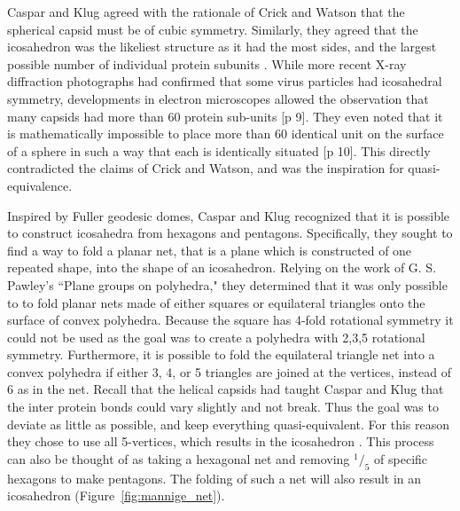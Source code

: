 \documentclass[12pt,letter]{article}
\newcommand*\rfrac[2]{{}^{#1}\!/_{#2}}
\begin{document}
Caspar and Klug agreed with the rationale of Crick and Watson that the spherical capsid must be of cubic symmetry. Similarly, they agreed that the icosahedron was the likeliest structure as it had the most sides, and the largest possible number of individual protein subunits \cite[p 7-8]{Caspar:1962}. While more recent X-ray diffraction photographs had confirmed that some virus particles had icosahedral symmetry, developments in electron microscopes allowed the observation that many capsids had more than 60 protein sub-units [p 9]. They even noted that it is mathematically impossible to place more than 60 identical unit on the surface of a sphere in such a way that each is identically situated [p 10]. This directly contradicted the claims of Crick and Watson, and was the inspiration for quasi-equivalence.

Inspired by Fuller geodesic domes, Caspar and Klug recognized that it is possible to construct icosahedra from hexagons and pentagons. Specifically, they sought to find a way to fold a planar net, that is a plane which is constructed of one repeated shape, into the shape of an icosahedron. Relying on the work of G. S. Pawley's ``Plane groups on polyhedra," \cite{Pawley:1962} they determined that it was only possible to to fold planar nets made of either squares or equilateral triangles onto the surface of convex polyhedra. Because the square has 4-fold rotational symmetry it could not be used as the goal was to create a polyhedra with 2,3,5 rotational symmetry. Furthermore, it is possible to fold the equilateral triangle net into a convex polyhedra if either 3, 4, or 5 triangles are joined at the vertices, instead of 6 as in the net. Recall that the helical capsids had taught Caspar and Klug that the inter protein bonds could vary slightly and not break. Thus the goal was to deviate as little as possible, and keep everything quasi-equivalent. For this reason they chose to use all 5-vertices, which results in the icosahedron \cite[p 11-13]{Caspar:1962}. This process can also be thought of as taking a hexagonal net and removing $\rfrac{1}{5}$ of specific hexagons to make pentagons. The folding of such a net will also result in an icosahedron (Figure~\ref{fig:mannige_net}).
\end{document}
